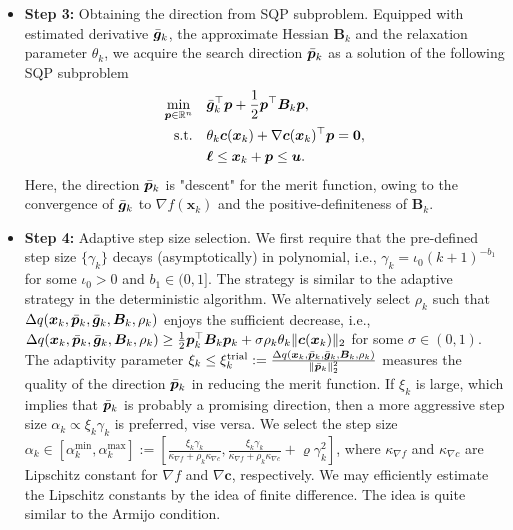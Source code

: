 \documentclass[aos]{imsart}
\numberwithin{equation}{section}
\theoremstyle{plain}
\begin{document}
\begin{itemize}
    \item \textbf{Step 3:} Obtaining the direction from SQP subproblem. Equipped with estimated derivative $\Bar{\bm{g}}_k$, the approximate Hessian $\bm{B}_k$ and the relaxation parameter $\theta_k$, we acquire the search direction $\Bar{\bm{p}}_k$ as a solution of the following SQP subproblem
    \begin{equation}
    \label{relaxed_sqp_subproblem_stoch}
    \begin{split}
        \min_{\bm{p} \in \mathbb{R}^{n}} & \hspace{1em} \Bar{\bm{g}}_k^{\top}\bm{p}+ \frac{1}{2}\bm{p}^{\top}\bm{B}_k\bm{p},\\
        \text{s.t.} & \hspace{1em} \theta_k \bm{c}(\bm{x}_k)+\nabla \bm{c}(\bm{x}_k)^{\top}\bm{p} = \bm{0},\\
        & \hspace{1em} \bm{\ell} \leq \bm{x}_k + \bm{p} \leq \bm{u}.
    \end{split}    
\end{equation} 
Here, the direction $\Bar{\bm{p}}_k$ is "descent" for the merit function, owing to the convergence of  $\Bar{\bm{g}}_k$ to $\nabla f(\bm{x}_k)$ and the positive-definiteness of $\bm{B}_k$. 
    

    \item \textbf{Step 4:} Adaptive step size selection. We first require that the pre-defined step size $\{\gamma_k\}$ decays (asymptotically) in polynomial, i.e., $\gamma_k = \iota_0 \left(k+1 \right)^{-b_1}$ for some $\iota_0 > 0$ and $b_1 \in (0,1]$. 
    The strategy is similar to the adaptive strategy in the deterministic algorithm. We alternatively select $\rho_k$ such that $\Delta q(\bm{x}_k,\Bar{\bm{p}}_k, \Bar{\bm{g}}_k, \bm{B}_k,\rho_k)$ enjoys the sufficient decrease, i.e., $\Delta q(\bm{x}_k,\Bar{\bm{p}}_k, \Bar{\bm{g}}_k, \bm{B}_k,\rho_k) \geq \frac{1}{2} \bm{p}_k^{\top} \bm{B}_k \bm{p}_k + \sigma \rho_k \theta_k \|\bm{c}(\bm{x}_k)\|_2$ for some $\sigma \in (0,1)$. The adaptivity parameter $\xi_k \leq \xi_k^{\text{trial}} := \frac{\Delta q(\bm{x}_k,\Bar{\bm{p}}_k, \Bar{\bm{g}}_k,\bm{B}_k,\rho_k)}{\|\Bar{\bm{p}}_k\|_2^2}$ measures the quality of the direction $\Bar{\bm{p}}_k$ in reducing the merit function. If $\xi_k$ is large, which implies that $\Bar{\bm{p}}_k$ is probably a promising direction, then a more aggressive step size $\alpha_k \propto \xi_k \gamma_k$ is preferred, vise versa. We select the step size  $\alpha_k \in \left[\alpha_k^{\text{min}}, \alpha_k^{\max} \right] :=  \left[ \frac{ \xi_{k}\gamma_k}{\kappa_{\nabla f} + \rho_k \kappa_{\nabla c}} , \frac{ \xi_{k}\gamma_k}{\kappa_{\nabla f} + \rho_k \kappa_{\nabla c}} + \varrho \gamma_k^2 \right]$, where $\kappa_{\nabla f}$ and $\kappa_{\nabla c}$ are Lipschitz constant for $\nabla f$ and $\nabla \bm{c}$, respectively. We may efficiently estimate the Lipschitz constants by the idea of finite difference. The idea is quite similar to the Armijo condition.


\end{itemize}
\end{document}
